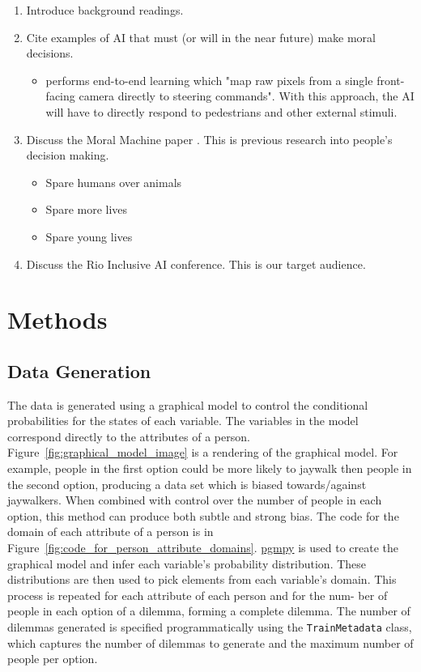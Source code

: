 \documentclass{report}
\newcommand{\code}{\texttt}
\begin{document}
\begin{enumerate}
    \item Introduce background readings.
    
    \item Cite examples of AI that must (or will in the near future) make moral decisions.
    \begin{itemize}
        \item \cite{bojarski2016end} performs end-to-end learning which "map raw pixels from a
        single front-facing camera directly to steering commands". With this approach, the AI will
        have to directly respond to pedestrians and other external stimuli.
    \end{itemize}
    
    \item Discuss the Moral Machine paper \cite{awad2018moral}. This is previous research into
    people's decision making.
    \begin{itemize}
        \item Spare humans over animals
        \item Spare more lives
        \item Spare young lives
    \end{itemize}
    
    \item Discuss the Rio Inclusive AI conference. This is our target audience.
\end{enumerate}

\chapter{Methods}

\section{Data Generation}

The data is generated using a graphical model to control the conditional probabilities for the
states of each variable. The variables in the model correspond directly to the attributes of a
person. Figure~\ref{fig:graphical_model_image} is a rendering of the graphical model. For example,
people in the first option could be more likely to jaywalk then people in the second option,
producing a data set which is biased towards/against jaywalkers. When combined with control over the
number of people in each option, this method can produce both subtle and strong bias. The code for
the domain of each attribute of a person is in Figure~\ref{fig:code_for_person_attribute_domains}.
\href{https://github.com/pgmpy/pgmpy}{pgmpy} is used to create the graphical model and infer each
variable’s probability distribution. These distributions are then used to pick elements from each
variable’s domain. This process is repeated for each attribute of each person and for the num- ber
of people in each option of a dilemma, forming a complete dilemma. The number of dilemmas generated
is specified programmatically using the \code{TrainMetadata} class, which captures the number of
dilemmas to generate and the maximum number of people per option.
\end{document}
